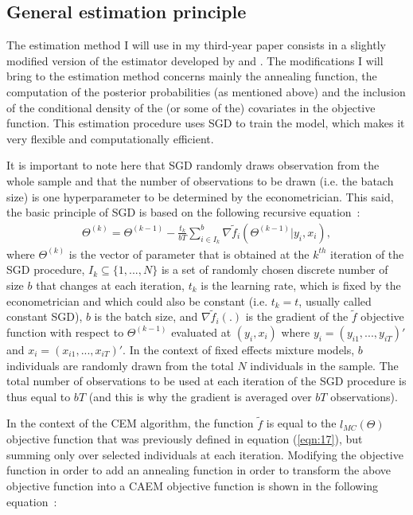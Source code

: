 \documentclass[11pt,letter]{article}
\begin{document}
\subsection{General estimation principle}
The estimation method I will use in my third-year paper consists in a slightly modified version of the estimator developed by \cite{gepperth_gradient-based_2020} and \cite{gepperth_gradient-based_2021}. The modifications I will bring to the estimation method concerns mainly the annealing function, the computation of the posterior probabilities (as mentioned above) and the inclusion of the conditional density of the (or some of the) covariates in the objective function. This estimation procedure uses SGD to train the model, which makes it very flexible and computationally efficient.
\par
It is important to note here that SGD randomly draws observation from the whole sample and that the number of observations to be drawn (i.e. the batach size) is one hyperparameter to be determined by the econometrician. This said, the basic principle of SGD is based on the following recursive equation~:
\begin{align*}
\Theta^{(k)} = \Theta^{(k-1)} - \frac{t_k}{bT} \sum_{i\in I_k}^{b} \nabla \tilde{f}_{i}(\Theta^{(k-1)}|y_{i},x_i),
\end{align*}
where $\Theta^{(k)}$ is the vector of parameter that is obtained at the $k^{th}$ iteration of the SGD procedure, $I_k \subseteq \{1,...,N\}$ is a set of randomly chosen discrete number of size $b$ that changes at each iteration, $t_k$ is the learning rate, which is fixed by the econometrician and which could also be constant (i.e. $t_k = t$, usually called constant SGD), $b$ is the batch size, and $\nabla \tilde{f}_{i}(.)$ is the gradient of the $\tilde{f}$ objective function with respect to $\Theta^{(k-1)}$ evaluated at $(y_i,x_i)$ where $y_i=(y_{i1},...,y_{iT})'$ and $x_i=(x_{i1},...,x_{iT})'$. In the context of fixed effects mixture models, $b$ individuals are randomly drawn from the total $N$ individuals in the sample. The total number of observations to be used at each iteration of the SGD procedure is thus equal to $bT$ (and this is why the gradient is averaged over $bT$ observations). 
\par
In the context of the CEM algorithm, the function $\tilde{f}$ is equal to the $l_{MC}(\Theta)$ objective function that was previously defined in equation (\ref{eqn:17}), but summing only over selected individuals at each iteration. Modifying the objective function in order to add an annealing function in order to transform the above objective function into a CAEM objective function is shown in the following equation~:
\end{document}
